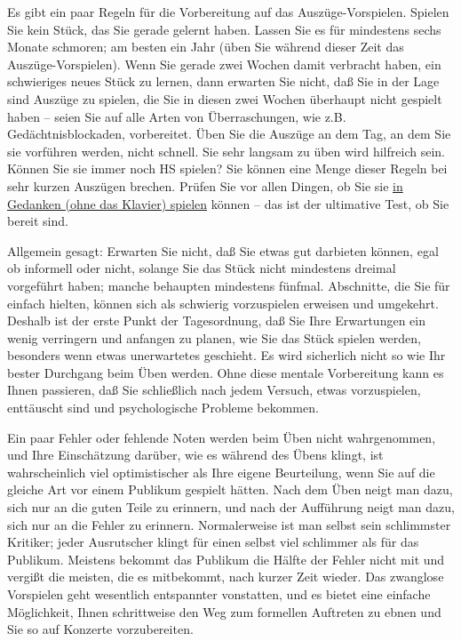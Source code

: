 Es gibt ein paar Regeln für die Vorbereitung auf das Auszüge-Vorspielen.
Spielen Sie kein Stück, das Sie gerade gelernt haben.
Lassen Sie es für mindestens sechs Monate schmoren; am besten ein Jahr (üben Sie während dieser Zeit das Auszüge-Vorspielen).
Wenn Sie gerade zwei Wochen damit verbracht haben, ein schwieriges neues Stück zu lernen, dann erwarten Sie nicht, daß Sie in der Lage sind Auszüge zu spielen, die Sie in diesen zwei Wochen überhaupt nicht gespielt haben -- seien Sie auf alle Arten von Überraschungen, wie z.B. Gedächtnisblockaden, vorbereitet.
Üben Sie die Auszüge an dem Tag, an dem Sie sie vorführen werden, nicht schnell.
Sie sehr langsam zu üben wird hilfreich sein.
Können Sie sie immer noch HS spielen?
Sie können eine Menge dieser Regeln bei sehr kurzen Auszügen brechen.
Prüfen Sie vor allen Dingen, ob Sie sie \hyperref[c1ii12mental]{in Gedanken (ohne das Klavier) spielen} können -- das ist der ultimative Test, ob Sie bereit sind.

Allgemein gesagt: Erwarten Sie nicht, daß Sie etwas gut darbieten können, egal ob informell oder nicht, solange Sie das Stück nicht mindestens dreimal vorgeführt haben; manche behaupten mindestens fünfmal.
Abschnitte, die Sie für einfach hielten, können sich als schwierig vorzuspielen erweisen und umgekehrt.
Deshalb ist der erste Punkt der Tagesordnung, daß Sie Ihre Erwartungen ein wenig verringern und anfangen zu planen, wie Sie das Stück spielen werden, besonders wenn etwas unerwartetes geschieht.
Es wird sicherlich nicht so wie Ihr bester Durchgang beim Üben werden.
Ohne diese mentale Vorbereitung kann es Ihnen passieren, daß Sie schließlich nach jedem Versuch, etwas vorzuspielen, enttäuscht sind und psychologische Probleme bekommen.

Ein paar Fehler oder fehlende Noten werden beim Üben nicht wahrgenommen, und Ihre Einschätzung darüber, wie es während des Übens klingt, ist wahrscheinlich viel optimistischer als Ihre eigene Beurteilung, wenn Sie auf die gleiche Art vor einem Publikum gespielt hätten.
Nach dem Üben neigt man dazu, sich nur an die guten Teile zu erinnern, und nach der Aufführung neigt man dazu, sich nur an die Fehler zu erinnern.
Normalerweise ist man selbst sein schlimmster Kritiker; jeder Ausrutscher klingt für einen selbst viel schlimmer als für das Publikum.
Meistens bekommt das Publikum die Hälfte der Fehler nicht mit und vergißt die meisten, die es mitbekommt, nach kurzer Zeit wieder.
Das zwanglose Vorspielen geht wesentlich entspannter vonstatten, und es bietet eine einfache Möglichkeit, Ihnen schrittweise den Weg zum formellen Auftreten zu ebnen und Sie so auf Konzerte vorzubereiten.

